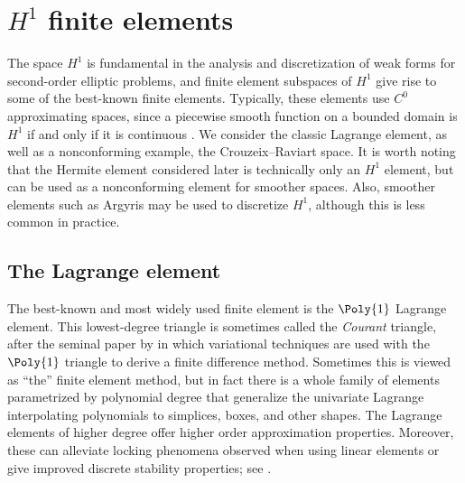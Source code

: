 \vspace*{7pt}
\section{$H^1$ finite elements}

The space $H^1$ is fundamental in the analysis and discretization of
weak forms for second-order elliptic problems, and finite element
subspaces of $H^1$ give rise to some of the best-known finite
elements. Typically, these elements use $C^0$ approximating spaces,
since a piecewise smooth function on a bounded domain is $H^1$ if and
only if it is continuous \citep[Theorem 5.2]{Braess2007}. We consider
the classic Lagrange element, as well as a nonconforming example, the
Crouzeix--Raviart space. It is worth noting that the Hermite element
considered later is technically only an $H^1$ element, but can be used
as a nonconforming element for smoother spaces.  Also, smoother
elements such as Argyris may be used to discretize $H^1$, although
this is less common in practice.

\vspace*{7pt}
\subsection{The Lagrange element}

The best-known and most widely used finite element is the $\Poly{1}$
Lagrange element. This lowest-degree triangle is sometimes called the
\emph{Courant} triangle, after the seminal paper by \citet{Courant1943}
in which variational techniques are used with the $\Poly{1}$ triangle
to derive a finite difference method. Sometimes this is viewed as
``the'' finite element method, but in fact there is a whole family of
elements parametrized by polynomial degree that generalize the
univariate Lagrange interpolating polynomials to simplices, boxes, and
other shapes. The Lagrange elements of higher degree offer higher
order approximation properties. Moreover, these can alleviate locking
phenomena observed when using linear elements or give improved
discrete stability properties; see \citet{TaylorHood1973,
  ScottVogelius1985}.

